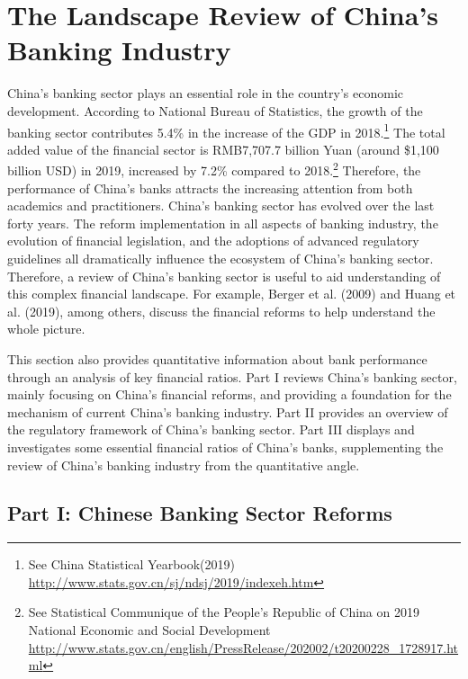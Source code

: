 \documentclass[
  letterpaper,
  DIV=11,
  numbers=noendperiod]{scrreprt}
\begin{document}

\chapter{The Landscape Review of China's Banking
Industry}\label{the-landscape-review-of-chinas-banking-industry}

China's banking sector plays an essential role in the country's economic
development. According to National Bureau of Statistics, the growth of
the banking sector contributes 5.4\% in the increase of the GDP in
2018.\footnote{See China Statistical Yearbook(2019)
  \url{http://www.stats.gov.cn/sj/ndsj/2019/indexeh.htm}} The total
added value of the financial sector is RMB7,707.7 billion Yuan (around
\$1,100 billion USD) in 2019, increased by 7.2\% compared to
2018.\footnote{See Statistical Communique of the People's Republic of
  China on 2019 National Economic and Social Development
  \url{http://www.stats.gov.cn/english/PressRelease/202002/t20200228_1728917.html}}
Therefore, the performance of China's banks attracts the increasing
attention from both academics and practitioners. China's banking sector
has evolved over the last forty years. The reform implementation in all
aspects of banking industry, the evolution of financial legislation, and
the adoptions of advanced regulatory guidelines all dramatically
influence the ecosystem of China's banking sector. Therefore, a review
of China's banking sector is useful to aid understanding of this complex
financial landscape. For example, Berger et al. (2009) and Huang et al.
(2019), among others, discuss the financial reforms to help understand
the whole picture.

This section also provides quantitative information about bank
performance through an analysis of key financial ratios. Part I reviews
China's banking sector, mainly focusing on China's financial reforms,
and providing a foundation for the mechanism of current China's banking
industry. Part II provides an overview of the regulatory framework of
China's banking sector. Part III displays and investigates some
essential financial ratios of China's banks, supplementing the review of
China's banking industry from the quantitative angle.

\section{Part I: Chinese Banking Sector
Reforms}\label{part-i-chinese-banking-sector-reforms}
\end{document}
